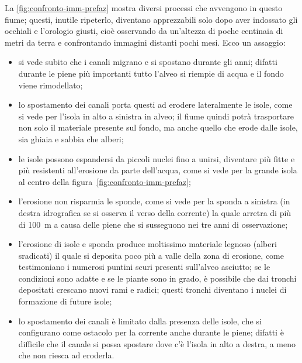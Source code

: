 \medskip
La \vref{fig:confronto-imm-prefaz} mostra diversi processi che avvengono in questo fiume; questi, inutile ripeterlo, diventano apprezzabili solo dopo aver indossato gli occhiali e l'orologio giusti, cioè osservando da un'altezza di poche centinaia di metri da terra e confrontando immagini distanti pochi mesi. Ecco un assaggio:
\begin{itemize}
	\item si vede subito che i canali migrano e si spostano durante gli anni; 
		difatti durante le piene più importanti tutto l'alveo si riempie di acqua e il fondo viene rimodellato;
	\item lo spostamento dei canali porta questi ad erodere lateralmente le isole, come si vede per l'isola in alto a sinistra in alveo; 
		il fiume quindi potrà trasportare non solo il materiale presente sul fondo, ma anche quello che erode dalle isole, sia ghiaia e sabbia che alberi;
	\item le isole possono espandersi da piccoli nuclei fino a unirsi, diventare più fitte e più resistenti all'erosione da parte dell'acqua, come si vede per la grande isola al centro della figura~\vref{fig:confronto-imm-prefaz};
	\item l'erosione non risparmia le sponde, come si vede per la sponda a sinistra (in destra idrografica se si osserva il verso della corrente) la quale arretra di più di \SI{100}{\m} a causa delle piene che si susseguono nei tre anni di osservazione;
	\item l'erosione di isole e sponda produce moltissimo materiale legnoso (alberi sradicati) il quale si deposita poco più a valle della zona di erosione, come testimoniano i numerosi puntini scuri presenti sull'alveo asciutto; 
		se le condizioni sono adatte e se le piante sono in grado, è possibile che dai tronchi depositati crescano nuovi rami e radici; 
		questi tronchi diventano i nuclei di formazione di future isole;
	\item lo spostamento dei canali è limitato dalla presenza delle isole, che si configurano come ostacolo per la corrente anche durante le piene;
		difatti è difficile che il canale si possa spostare dove c'è l'isola in alto a destra, a meno che non riesca ad eroderla.
\end{itemize}


